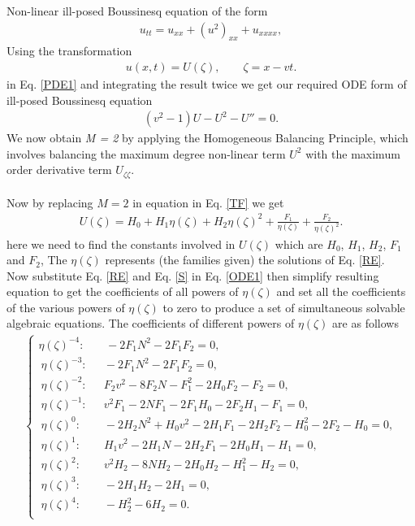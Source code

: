 \documentclass{article}
\numberwithin{equation}{section}
\begin{document}
Non-linear ill-posed Boussinesq equation of the form
\begin{eqnarray}\label{PDE1}
u_{\mathit{tt}} =u_{\mathit{xx}}+\left(u^{2}\right)_{\mathit{xx}}+u_{\mathit{xxxx}},
\end{eqnarray}
Using the transformation
\begin{eqnarray}\label{TF1}
u(x,t)=U(\zeta), \qquad \zeta=x - v t.
\end{eqnarray}
in Eq. \ref{PDE1} and integrating the result twice we get our required ODE form of ill-posed Boussinesq equation
\begin{eqnarray}\label{ODE1}
\left(v^{2}-1\right) U -U^{2}-U'' = 0.
\end{eqnarray}
We now obtain \emph{M = 2} by applying the Homogeneous Balancing Principle, which involves balancing the maximum degree non-linear term $U^{2}$ with the maximum order derivative term $U_{\zeta \zeta}$.\\\\
Now by replacing $M=2$ in equation in Eq. \ref{TF} we get
\begin{eqnarray}\label{S}
U  \left(\zeta \right) =H_{0}+H_{1} \eta  \left(\zeta \right)+H_{2} \eta  \left(\zeta \right)^{2}+\frac{F_{1}}{\eta \! \left(\zeta \right)}+\frac{F_{2}}{\eta  \left(\zeta \right)^{2}}.
\end{eqnarray}
here we need to find the constants involved in $U{(\zeta)}$ which are $H_{0}$, $H_{1}$, $H_{2}$, $F_{1}$ and $F_{2}$,
The $\eta{(\zeta)}$ represents (the families given) the solutions of Eq. \ref{RE}.\\
Now substitute Eq. \ref{RE} and Eq. \ref{S} in Eq. \ref{ODE1} then simplify resulting equation to get the coefficients of all powers of ${\eta(\zeta)}$ and set all the coefficients of the various powers of $\eta{(\zeta)}$ to zero to produce a set of simultaneous solvable algebraic equations.
The coefficients of different powers of $\eta{(\zeta)}$ are as follows\\
\begin{align}
\begin{cases}
\eta{(\zeta)}^{-4} :\;\;\;\quad -2 F_{1} N^{2}-2 F_{1} F_{2}=0, \\\
\eta{(\zeta)}^{-3} :\;\,\quad -2 F_{1} N^{2}-2 F_{1} F_{2}=0, \\\
\eta{(\zeta)}^{-2} :\;\,\quad F_{2} v^{2}-8 F_{2} N -F_{1}^{2}-2 H_{0} F_{2}-F_{2}=0,\\\
\eta{(\zeta)}^{-1} :\,\;\quad v^{2} F_{1}-2 N F_{1}-2 F_{1} H_{0}-2 F_{2} H_{1}-F_{1}=0, \\\
\eta{(\zeta)}^{0}  :\qquad -2 H_{2} N^{2}+H_{0} v^{2}-2 H_{1} F_{1}-2 H_{2} F_{2}-H_{0}^{2}-2 F_{2}-H_{0}=0,\\\
\eta{(\zeta)}^{1}  :\qquad H_{1} v^{2}-2 H_{1} N -2 H_{2} F_{1}-2 H_{0} H_{1}-H_{1}=0, \\\
\eta{(\zeta)}^{2}  :\qquad v^{2} H_{2}-8 N H_{2}-2 H_{0} H_{2}-H_{1}^{2}-H_{2}=0, \\\
\eta{(\zeta)}^{3}  :\qquad-2 H_{1} H_{2}-2 H_{1}=0, \\\
\eta{(\zeta)}^{4}  :\qquad-H_{2}^{2}-6 H_{2}=0.\\\
\end{cases}
\end{align}
\end{document}
